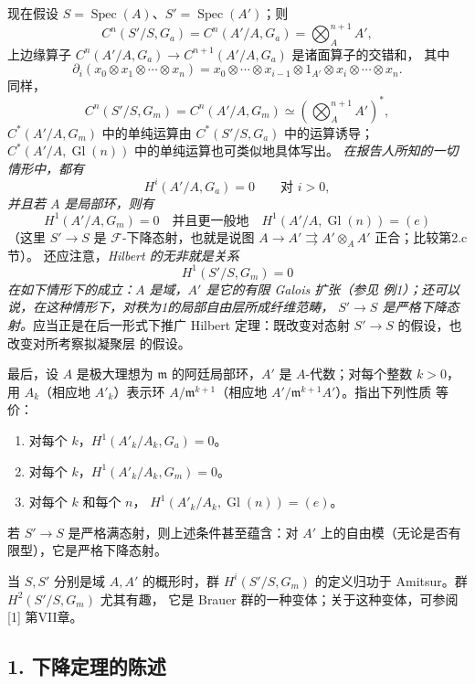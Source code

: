 现在假设 $S=\operatorname{Spec}(A)$、$S'=\operatorname{Spec}(A')$；则
\[
  C^n(S'/S,G_a)=C^n(A'/A,G_a)=\bigotimes_A^{n+1}A',
\]
上边缘算子
$C^n(A'/A,G_a)\longrightarrow C^{n+1}(A'/A,G_a)$ 是诸面算子的交错和，
其中
\[
  \partial_i(x_0\otimes x_1\otimes\cdots\otimes x_n)
  =x_0\otimes\cdots\otimes x_{i-1}\otimes1_{A'}\otimes
   x_i\otimes\cdots\otimes x_n.
\]
同样，
\[
  C^n(S'/S,G_m)=C^n(A'/A,G_m)
  \simeq\left(\bigotimes_A^{n+1}A'\right)^*,
\]
$C^*(A'/A,G_m)$ 中的单纯运算由 $C^*(S'/S,G_a)$ 中的运算诱导；
$C^*(A'/A,\operatorname{Gl}(n))$ 中的单纯运算也可类似地具体写出。
\emph{在报告人所知的一切情形中，都有}
\[
  H^i(A'/A,G_a)=0\qquad\text{对 $i>0$},
\]
\emph{并且若 $A$ 是局部环，则有}
\[
  H^1(A'/A,G_m)=0
  \quad\text{并且更一般地}\quad
  H^1(A'/A,\operatorname{Gl}(n))=(e)
\]
（这里 $S'\longrightarrow S$ 是 $\mathcal F$-下降态射，也就是说图
$A\longrightarrow A'\rightrightarrows A'\otimes_AA'$ 正合；比较第2.c节）。
还应注意，\emph{Hilbert 的无非就是关系}
\[
  H^1(S'/S,G_m)=0
\]
\emph{在如下情形下的成立：$A$ 是域，$A'$ 是它的有限 Galois 扩张（参见
例1）；还可以说，在这种情形下，对秩为1的局部自由层所成纤维范畴，
$S'\longrightarrow S$ 是严格下降态射。}应当正是在后一形式下推广 Hilbert
定理：既改变对态射 $S'\longrightarrow S$ 的假设，也改变对所考察拟凝聚层
的假设。

最后，设 $A$ 是极大理想为 $\mathfrak m$ 的阿廷局部环，$A'$ 是
$A$-代数；对每个整数 $k>0$，用 $A_k$（相应地 $A'_k$）表示环
$A/\mathfrak m^{k+1}$（相应地 $A'/\mathfrak m^{k+1}A'$）。指出下列性质
等价：
\begin{enumerate}
\item[(i)] 对每个 $k$，$H^1(A'_k/A_k,G_a)=0$。
\item[(ii)] 对每个 $k$，$H^1(A'_k/A_k,G_m)=0$。
\item[(iii)] 对每个 $k$ 和每个 $n$，
$H^1(A'_k/A_k,\operatorname{Gl}(n))=(e)$。
\end{enumerate}
若 $S'\longrightarrow S$ 是严格满态射，则上述条件甚至蕴含：对
$A'$ 上的自由模（无论是否有限型），它是严格下降态射。

 当 $S,S'$ 分别是域 $A,A'$ 的概形时，群
$H^i(S'/S,G_m)$ 的定义归功于 Amitsur。群 $H^2(S'/S,G_m)$ 尤其有趣，
它是 Brauer 群的一种变体；关于这种变体，可参阅 [1] 第VII章。


\subsection*{1. 下降定理的陈述}

